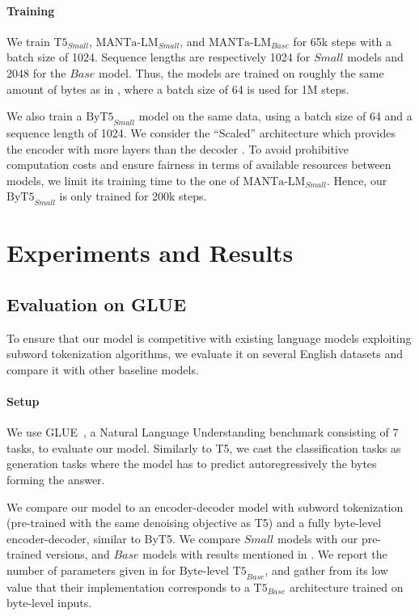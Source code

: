 \paragraph{Training} We train $\text{T5}_{Small}$, $\text{MANTa-LM}_{Small}$, and $\text{MANTa-LM}_{Base}$ for 65k steps with a batch size of 1024. Sequence lengths are respectively 1024 for $Small$ models and 2048 for the $Base$ model. Thus, the models are trained on roughly the same amount of bytes as in \citet{tay2021charformer}, where a batch size of 64 is used for 1M steps. 

We also train a $\text{ByT5}_{Small}$ model on the same data, using a batch size of 64 and a sequence length of 1024. We consider the ``Scaled'' architecture which provides the encoder with more layers than the decoder \cite{xue2022byt5}. To avoid prohibitive computation costs and ensure fairness in terms of available resources between models, we limit its training time to the one of $\text{MANTa-LM}_{Small}$. Hence, our $\text{ByT5}_{Small}$ is only trained for 200k steps.



\section{Experiments and Results}
\subsection{Evaluation on GLUE}

To ensure that our model is competitive with existing language models exploiting subword tokenization algorithms, we evaluate it on several English datasets and compare it with other baseline models.

\paragraph{Setup} We use GLUE~\cite{wang-etal-2018-glue}, a Natural Language Understanding benchmark consisting of 7 tasks, to evaluate our model. Similarly to T5, we cast the classification tasks as generation tasks where the model has to predict autoregressively the bytes forming the answer. 

We compare our model to an encoder-decoder model with subword tokenization (pre-trained with the same denoising objective as T5) and a fully byte-level encoder-decoder, similar to ByT5. We compare $Small$ models with our pre-trained versions, and $Base$ models with results mentioned in \citet{tay2021charformer}. We report the number of parameters given in \citet{tay2021charformer} for $\text{Byte-level T5}_{Base}$, and gather from its low value that their implementation corresponds to a $\text{T5}_{Base}$ architecture trained on byte-level inputs. 

